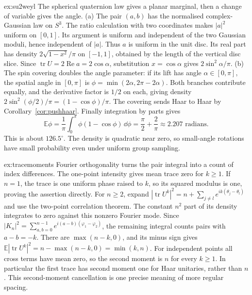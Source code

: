\begin{solution}{ex:su2weyl}
\idea The spherical quaternion law gives a planar marginal, then a change
of variable gives the angle.
\writeup (a) The pair $(a,b)$ has the normalised complex-Gaussian law
on $S^3$. The ratio calculation with two coordinates makes $|a|^2$
uniform on $[0,1]$. Its argument is uniform and independent of the two
Gaussian moduli, hence independent of $|a|$.
Thus $a$ is uniform in the unit disc. Its real part has density
$2\sqrt{1-x^2}/\pi$ on $[-1,1]$, obtained by the length of the vertical
disc slice. Since $\operatorname{tr}U=2\operatorname{Re}a=2\cos\alpha$,
substitution $x=\cos\alpha$ gives $2\sin^2\alpha/\pi$.
(b) The spin covering doubles the angle parameter: if its lift has
angle $\alpha\in[0,\pi]$, the spatial angle in $[0,\pi]$ is
$\phi=\min(2\alpha,2\pi-2\alpha)$.
Both branches contribute equally, and the derivative factor is $1/2$
on each, giving density
$2\sin^2(\phi/2)/\pi=(1-\cos\phi)/\pi$.
The covering sends Haar to Haar by Corollary~\ref{cor:pushhaar}.
Finally integration by parts gives
\[
 \mathbb E\phi=\frac1\pi\int_0^\pi\phi(1-\cos\phi)\,\dd\phi
 =\frac\pi2+\frac2\pi\approx2.207\text{ radians}.
\]
This is about $126.5^\circ$. The density is quadratic near zero, so
small-angle rotations have small probability even under uniform group
sampling.
\end{solution}
\begin{solution}{ex:tracemoments}
\idea Fourier orthogonality turns the pair integral into a count of index
differences.
\writeup The one-point intensity gives mean trace zero for $k\ge1$.
If $n=1$, the trace is one uniform phase raised to $k$, so its squared
modulus is one, proving the assertion directly.
For $n\ge2$, expand
$|\operatorname{tr}U^k|^2=n+\sum_{j\ne l}e^{ik(\theta_j-\theta_l)}$
and use the two-point correlation theorem.
The constant $n^2$ part of its density integrates to zero against this
nonzero Fourier mode. Since
$|K_n|^2=\sum_{a,b=0}^{n-1}e^{i(a-b)(\varphi_1-\varphi_2)}$,
the remaining integral counts pairs with $a-b=-k$.
There are $\max(n-k,0)$, and its minus sign gives
$\mathbb E|\operatorname{tr}U^k|^2=n-\max(n-k,0)=\min(k,n)$.
For independent points all cross terms have mean zero, so the second
moment is $n$ for every $k\ge1$.
In particular the first trace has second moment one for Haar unitaries,
rather than $n$. This second-moment cancellation is one precise meaning
of more regular spacing.
\end{solution}
